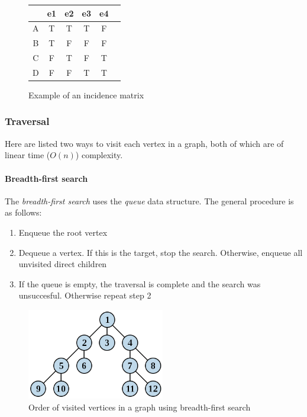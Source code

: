 \documentclass{article}
\begin{document}
\begin{figure}[H]
  \centering
  \begin{tabular}{|c|c|c|c|c|c|}
    \hline
    \  & e1 & e2 & e3 & e4 \\ [0.5ex]
    \hline
    A  & T  & T  & T  & F  \\ 
    \hline
    B  & T  & F  & F  & F  \\
    \hline
    C  & F  & T  & F  & T  \\
    \hline
    D  & F  & F  & T  & T  \\
    \hline
  \end{tabular}
  \caption{Example of an incidence matrix}
\end{figure}


\subsubsection{Traversal}
Here are listed two ways to visit each vertex in a graph,
both of which are of linear time (\(O(n)\)) complexity.

\paragraph{Breadth-first search}
The {\em breadth-first search} uses the {\em queue} data structure. The general procedure is as follows:
\begin{enumerate}
\item{Enqueue the root vertex}
\item{Dequeue a vertex. If this is the target, stop the search. Otherwise, enqueue all unvisited direct children}
\item{If the queue is empty, the traversal is complete and the search was unsuccesful. Otherwise repeat step 2}
\end{enumerate}

\begin{figure}[H]
  \centering
  \includegraphics[width=6cm]{breadth_first_search}
  \caption{Order of visited vertices in a graph using breadth-first search \cite{bfs}}
\end{figure}
\end{document}
